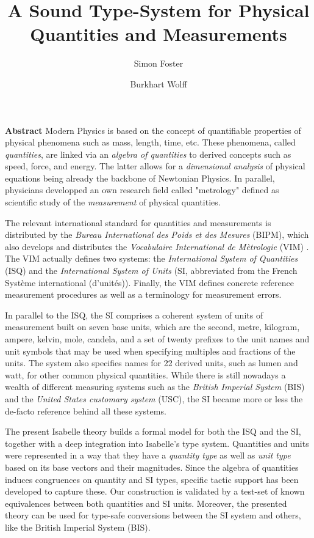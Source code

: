 \documentclass[11pt,a4paper]{book}
\begin{document}
\title{A Sound Type-System for Physical Quantities and Measurements}
\author{Simon Foster \and Burkhart Wolff}
\maketitle

\textbf{ Abstract } 
Modern Physics is based on the concept of quantifiable properties of physical phenomena such as mass, 
length, time, etc. These phenomena, called \emph{quantities}, are linked via an 
\emph{algebra of quantities} to derived concepts such as speed, force, and energy. The latter allows for a 
\emph{dimensional analysis} of physical equations being already the backbone of Newtonian Physics. 
In parallel, physicians developped an own research field called "metrology" defined as scientific 
study of the \emph{measurement} of physical quantities.

The relevant international standard for quantities and measurements is distributed by the
\emph{Bureau International des Poids et des Mesures} (BIPM), which also develops and distributes
the \emph{Vocabulaire International de M\`etrologie} (VIM) \cite{bipm-jcgm:2012:VIM}.
The VIM actually defines two systems: the \emph{International System of Quantities}
(ISQ) and the \emph{International System of Units} (SI, abbreviated from the French  Syst\`eme 
international (d’unit\'es)). Finally, the VIM defines concrete reference
measurement procedures as well as a terminology for measurement errors. 

In parallel to the ISQ, the SI comprises a coherent system of units of measurement built on 
seven base units, which are the second, metre, kilogram, ampere, kelvin, mole, candela, and a 
set of twenty prefixes to the unit names and unit symbols that may be used when specifying multiples 
and fractions of the units. The system also specifies names for 22 derived units, such as lumen and 
watt, for other common physical quantities. 
While there is still nowadays a wealth of different measuring systems such as the 
\emph{British Imperial System} (BIS) and the \emph{United States customary system} (USC), the
SI became more or less the de-facto reference behind all these systems.

The present Isabelle theory builds a formal model for both the ISQ and the SI, together with a 
deep integration into Isabelle's type system. Quantities and units were represented in a way that 
they have a  \emph{quantity type} as well as \emph{unit type} based on its 
base vectors and their magnitudes. Since the algebra of quantities induces congruences on 
quantity and SI types, specific tactic support has been developed to capture these.
Our construction is validated by a test-set of known equivalences between both quantities and SI units.
Moreover, the presented theory can be used for type-safe conversions between the SI system and
others, like the British Imperial System (BIS).
\end{document}
